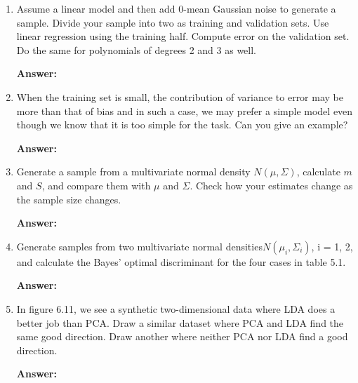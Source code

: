 \documentclass{article}
\begin{document}
\begin{enumerate}
    \item  Assume a linear model and then add $0$-mean Gaussian noise to generate a sample. Divide your sample into two as training and validation sets. Use linear regression using the training half. Compute error on the validation set. Do the same for polynomials of degrees 2 and 3 as well. %
    
    \textbf{Answer:} \\

    \item  When the training set is small, the contribution of variance to error may be more than that of bias and in such a case, we may prefer a simple model even though we know that it is too simple for the task. Can you give an example? %
    
    \textbf{Answer:} \\

    \item Generate a sample from a multivariate normal density $N(\mu, \Sigma)$, calculate $m$ and $S$, and compare them with $\mu$ and $\Sigma$. Check how your estimates change as the sample size changes. %
    
    \textbf{Answer:} \\

    \item  Generate samples from two multivariate normal densities$ N(\mu_i, \Sigma_i)$, i = 1, 2, and calculate the Bayes’ optimal discriminant for the four cases in table 5.1. %
    
    \textbf{Answer:} \\

    \item  In figure 6.11, we see a synthetic two-dimensional data where LDA does a better job than PCA. Draw a similar dataset where PCA and LDA find the same good direction. Draw another where neither PCA nor LDA find a good direction. %
    
    \textbf{Answer:} \\


\end{enumerate}
\end{document}
